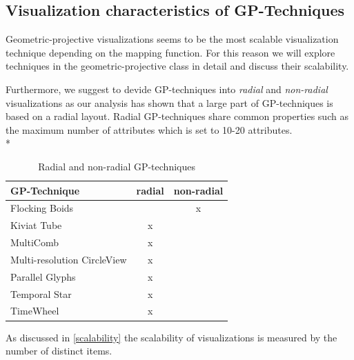 \fi

\subsection{Visualization characteristics of GP-Techniques}
Geometric-projective visualizations seems to be the most scalable visualization technique depending on the mapping function. For this reason we will explore techniques in the geometric-projective class in detail and discuss their scalability.


Furthermore, we suggest to devide GP-techniques into \textit{radial} and \textit{non-radial} visualizations\cite{Diehl2010} as our  analysis has shown that a large part of GP-techniques is based on a radial layout. Radial GP-techniques share common properties such as the maximum number of attributes which is set to 10-20 attributes\cite{Diehl2010}.\\*


\begin{table}[H]
	\centering
	\caption[Table 1]{Radial and non-radial GP-techniques}
	\label{radialTable}
	\begin{tabu}{lcc}
	\toprule
	GP-Technique & radial & non-radial \\
	\midrule
	Flocking Boids &  & x \\
	Kiviat Tube & x &  \\
	MultiComb & x &  \\
	Multi-resolution CircleView & x &  \\
	Parallel Glyphs & x &  \\
    Temporal Star & x &  \\
	TimeWheel & x & \\
	\bottomrule
	\end{tabu}
\end{table}

As discussed in \ref{scalability} the scalability of visualizations is measured by the number of distinct items.

